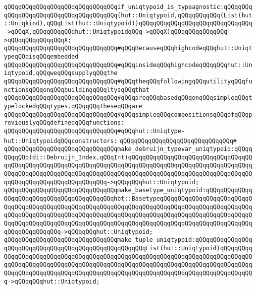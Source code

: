 \verb|qQQqqQQqqQQqqQQqqQQqqQQqqQQqqQQqif_uniqtypoid_is_typeagnostic:qQQqqQQqqQQqqQQqqQQqqQQqqQQqqQQqqQQqqQQq(hut::Uniqtypoid,qQQqqQQqqQQq(List(hut::Uniqkind),qQQqList(hut::Uniqtypoid))qQQqqQQqqQQqqQQqqQQqqQQqqQQqqQQq->qQQqX,qQQqqQQqqQQqhut::UniqtypoidqQQq->qQQqX)qQQqqQQqqQQqqQQq->qQQqqQQqqQQqqQQqX;|\newline
\newline
\newline
\newline
\verb|qQQqqQQqqQQqqQQqqQQqqQQqqQQqqQQq#qQQqBecauseqQQqhighcodeqQQqhut::UniqtypeqQQqisqQQqembedded|\newline
\verb|qQQqqQQqqQQqqQQqqQQqqQQqqQQqqQQq#qQQqinsideqQQqhighcodeqQQqqQQqhut::Uniqtypoid,qQQqweqQQqsupplyqQQqthe|\newline
\verb|qQQqqQQqqQQqqQQqqQQqqQQqqQQqqQQq#qQQqtheqQQqfollowingqQQqutilityqQQqfunctionsqQQqonqQQqbuildingqQQqltysqQQqthat|\newline
\verb|qQQqqQQqqQQqqQQqqQQqqQQqqQQqqQQq#qQQqareqQQqbasedqQQqonqQQqsimpleqQQqtypelockedqQQqtypes.qQQqqQQqTheseqQQqare|\newline
\verb|qQQqqQQqqQQqqQQqqQQqqQQqqQQqqQQq#qQQqsimpleqQQqcompositionsqQQqofqQQqpreviouslyqQQqdefinedqQQqfunctions:|\newline
\newline
\verb|qQQqqQQqqQQqqQQqqQQqqQQqqQQqqQQq#qQQqhut::Uniqtype-hut::UniqtypoidqQQqconstructors:|\newline
\verb|qQQqqQQqqQQqqQQqqQQqqQQqqQQqqQQq#|\newline
\verb|qQQqqQQqqQQqqQQqqQQqqQQqqQQqqQQqmake_debruijn_typevar_uniqtypoid:qQQqqQQqqQQq(di::Debruijn_Index,qQQqInt)qQQqqQQqqQQqqQQqqQQqqQQqqQQqqQQqqQQqqQQqqQQqqQQqqQQqqQQqqQQqqQQqqQQqqQQqqQQqqQQqqQQqqQQqqQQqqQQqqQQqqQQqqQQqqQQqqQQqqQQqqQQqqQQqqQQqqQQqqQQqqQQqqQQqqQQqqQQqqQQqqQQqqQQqqQQqqQQqqQQqqQQqqQQqqQQqqQQqqQQqqQQq->qQQqqQQqhut::Uniqtypoid;|\newline
\verb|qQQqqQQqqQQqqQQqqQQqqQQqqQQqqQQqmake_basetype_uniqtypoid:qQQqqQQqqQQqqQQqqQQqqQQqqQQqqQQqqQQqqQQqqQQqhbt::BasetypeqQQqqQQqqQQqqQQqqQQqqQQqqQQqqQQqqQQqqQQqqQQqqQQqqQQqqQQqqQQqqQQqqQQqqQQqqQQqqQQqqQQqqQQqqQQqqQQqqQQqqQQqqQQqqQQqqQQqqQQqqQQqqQQqqQQqqQQqqQQqqQQqqQQqqQQqqQQqqQQqqQQqqQQqqQQqqQQqqQQqqQQqqQQqqQQqqQQqqQQqqQQqqQQqqQQqqQQqqQQqqQQqqQQqqQQqqQQqqQQqqQQqqQQqqQQq->qQQqqQQqhut::Uniqtypoid;|\newline
\verb|qQQqqQQqqQQqqQQqqQQqqQQqqQQqqQQqmake_tuple_uniqtypoid:qQQqqQQqqQQqqQQqqQQqqQQqqQQqqQQqqQQqqQQqqQQqqQQqqQQqqQQqList(hut::Uniqtypoid)qQQqqQQqqQQqqQQqqQQqqQQqqQQqqQQqqQQqqQQqqQQqqQQqqQQqqQQqqQQqqQQqqQQqqQQqqQQqqQQqqQQqqQQqqQQqqQQqqQQqqQQqqQQqqQQqqQQqqQQqqQQqqQQqqQQqqQQqqQQqqQQqqQQqqQQqqQQqqQQqqQQqqQQqqQQqqQQqqQQqqQQqqQQqqQQqqQQqqQQqqQQqqQQqqQQqqQQqqQQq->qQQqqQQqhut::Uniqtypoid;|\newline
